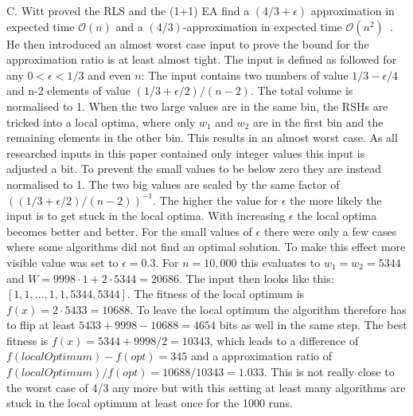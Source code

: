 C. Witt proved the RLS and the (1+1) EA find a $(4/3+\epsilon)$ approximation in expected time $\mathcal{O}(n)$ and a $(4/3)$-approximation in expected time $\mathcal{O}(n^2)$~\cite{diekert2005stacs}.
He then introduced an almost worst case input to prove the bound for the approximation ratio is at least almost tight.
The input is defined as followed for any $0<\epsilon<1/3$ and even $n$:\newline
The input contains two numbers of value $1/3 - \epsilon/4$ and n-2 elements of value $(1/3+\epsilon/2)/(n-2)$. 
The total volume is normalised to 1.
When the two large values are in the same bin, the RSHs are tricked into a local optima, where only $w_1$ and $w_2$ are in the first bin and the remaining elements in the other bin.
This results in an almost worst case.
As all researched inputs in this paper contained only integer values this input is adjusted a bit.
To prevent the small values to be below zero they are instead normalised to 1.
The two big values are scaled by the same factor of $((1/3+\epsilon/2)/(n-2))^{-1}$.
The higher the value for $\epsilon$ the more likely the input is to get stuck in the local optima.
With increasing $\epsilon$ the local optima becomes better and better.
For the small values of $\epsilon$ there were only a few cases where some algorithms did not find an optimal solution.
To make this effect more visible value was set to $\epsilon=0.3$.\newline
For $n=10,000$ this evaluates to $w_1=w_2=5344$ and $W=9998 \cdot 1 + 2 \cdot 5344 = 20686$.
The input then looks like this: $[1, 1, \dots, 1, 1, 5344, 5344]$.
The fitness of the local optimum is $f(x) = 2 \cdot 5433 = 10688$.
To leave the local optimum the algorithm therefore has to flip at least  $5433+9998-10688 = 4654$ bits as well in the same step.
The best fitness is $f(x) = 5344 + 9998/2 = 10343$, which leads to a difference of $f(localOptimum)-f(opt) = 345$ and a approximation ratio of $f(localOptimum)/f(opt)=10688/10343=1.033$.
This is not really close to the worst case of 4/3 any more but with this setting at least many algorithms are stuck in the local optimum at least once for the 1000 runs.